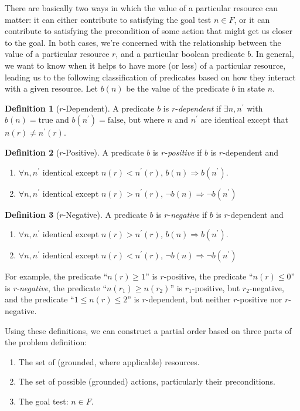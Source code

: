 \documentclass[letterpaper]{article}
\theoremstyle{plain} \newtheorem{theorem}{Theorem} \newtheorem{proposition}{Proposition} \newtheorem{lemma}{Lemma}
\theoremstyle{definition} \newtheorem{definition}{Definition} \newtheorem{conjecture}{Conjecture} \newtheorem*{example}{Example}
\theoremstyle{remark} \newtheorem*{remark}{Remark} \newtheorem*{note}{Note} \newtheorem{case}{Case}
\begin{document}
There are basically two ways in which the value of a particular resource can matter: it can
either contribute to satisfying the goal test $n \in F$, or it can contribute to satisfying
the precondition of some action that might get us closer to the goal. In both cases, we're
concerned with the relationship between the value of a particular resource $r$, and a
particular boolean predicate $b$. In general, we want to know when it helps to have more (or less) of a particular resource, leading us to the following classification
of predicates based on how they interact with a given resource. Let $b(n)$ be the value of the predicate $b$ in state $n$.
\begin{definition}[$r$-Dependent]
A predicate $b$ is $r$-\textit{dependent} if $\exists n, n^\prime$ with $b(n) = \text{true}$ and $b(n^\prime) = \text{false}$, but where $n$ and $n^\prime$ are identical except that $n(r) \ne n^\prime(r)$.
\end{definition}
\begin{definition}[$r$-Positive]
	A predicate $b$ is $r$-\textit{positive} if $b$ is $r$-dependent and
	\begin{enumerate}
		\item $\forall n, n^\prime$ identical except $n(r) < n^\prime(r)$, $b(n) \Rightarrow b(n^\prime).$
		\item $\forall n, n^\prime$ identical except $n(r) > n^\prime(r)$, $\neg b(n) \Rightarrow \neg b(n^\prime)$
	\end{enumerate}
\end{definition}
\begin{definition}[$r$-Negative]
	A predicate $b$ is $r$-\textit{negative} if $b$ is $r$-dependent and
	\begin{enumerate}
		\item $\forall n, n^\prime$ identical except $n(r) > n^\prime(r)$, $b(n) \Rightarrow b(n^\prime).$
		\item $\forall n, n^\prime$ identical except $n(r) < n^\prime(r)$, $\neg b(n) \Rightarrow \neg b(n^\prime)$
	\end{enumerate}
\end{definition}
For example, the predicate ``$n(r) \ge 1$'' is $r$-positive, the predicate ``$n(r) \le 0$'' is \textit{r-negative}, the predicate ``$n(r_1) \ge n(r_2)$'' is $r_1$-positive, but $r_2$-negative, and the predicate ``$1 \le n(r) \le 2$'' is $r$-dependent, but neither $r$-positive nor $r$-negative.

Using these definitions, we can construct a partial order based on three parts of the problem definition:
\begin{enumerate}
	\item The set of (grounded, where applicable) resources.
	\item The set of possible (grounded) actions, particularly their preconditions.
	\item The goal test: $n \in F$.
\end{enumerate}
\end{document}
